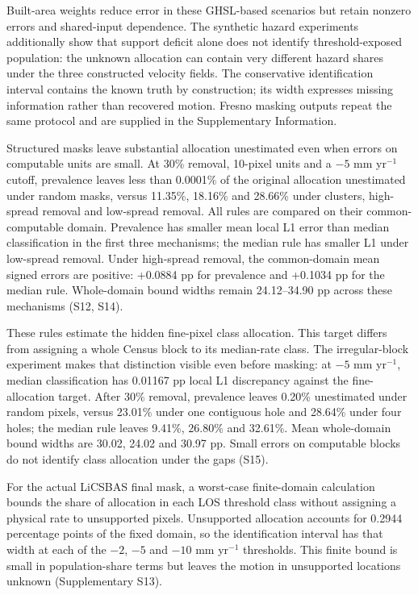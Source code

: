 \documentclass[pdflatex,lineno,sn-nature]{sn-jnl}
\begin{document}
Built-area weights reduce error in these GHSL-based scenarios but retain nonzero errors and shared-input dependence. The synthetic hazard experiments additionally show that support deficit alone does not identify threshold-exposed population: the unknown allocation can contain very different hazard shares under the three constructed velocity fields. The conservative identification interval contains the known truth by construction; its width expresses missing information rather than recovered motion. Fresno masking outputs repeat the same protocol and are supplied in the Supplementary Information.

Structured masks leave substantial allocation unestimated even when errors on computable units are small. At 30\% removal, 10-pixel units and a $-5$ mm yr$^{-1}$ cutoff, prevalence leaves less than 0.0001\% of the original allocation unestimated under random masks, versus 11.35\%, 18.16\% and 28.66\% under clusters, high-spread removal and low-spread removal. All rules are compared on their common-computable domain. Prevalence has smaller mean local L1 error than median classification in the first three mechanisms; the median rule has smaller L1 under low-spread removal. Under high-spread removal, the common-domain mean signed errors are positive: +0.0884 pp for prevalence and +0.1034 pp for the median rule. Whole-domain bound widths remain 24.12--34.90 pp across these mechanisms (S12, S14).

These rules estimate the hidden fine-pixel class allocation. This target differs from assigning a whole Census block to its median-rate class. The irregular-block experiment makes that distinction visible even before masking: at $-5$ mm yr$^{-1}$, median classification has 0.01167 pp local L1 discrepancy against the fine-allocation target. After 30\% removal, prevalence leaves 0.20\% unestimated under random pixels, versus 23.01\% under one contiguous hole and 28.64\% under four holes; the median rule leaves 9.41\%, 26.80\% and 32.61\%. Mean whole-domain bound widths are 30.02, 24.02 and 30.97 pp. Small errors on computable blocks do not identify class allocation under the gaps (S15).

For the actual LiCSBAS final mask, a worst-case finite-domain calculation bounds the share of allocation in each LOS threshold class without assigning a physical rate to unsupported pixels. Unsupported allocation accounts for 0.2944 percentage points of the fixed domain, so the identification interval has that width at each of the $-2$, $-5$ and $-10$ mm yr$^{-1}$ thresholds. This finite bound is small in population-share terms but leaves the motion in unsupported locations unknown (Supplementary S13).
\end{document}
